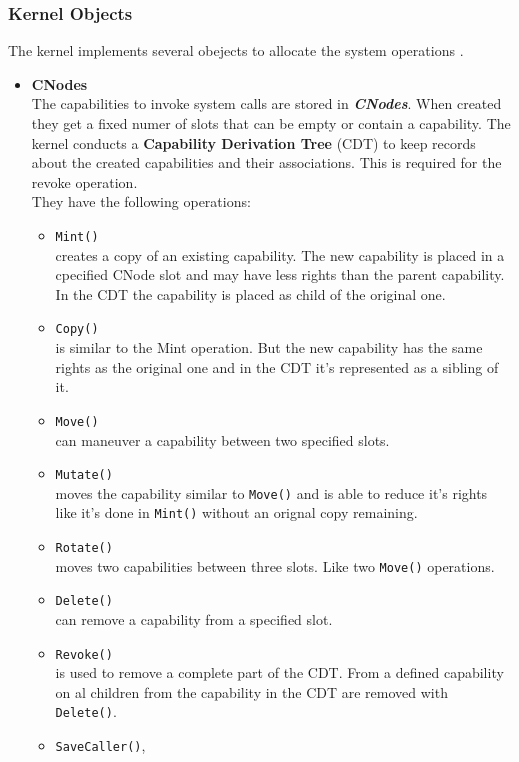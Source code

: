 \documentclass[pdftex,11pt,a4paper]{article}
\begin{document}
	\subsubsection{Kernel Objects}
	The kernel implements several obejects to allocate the system operations \cite{Manual}.
	\begin{itemize}
	\item \textbf{CNodes} \\
	The capabilities to invoke system calls are stored in \textbf{\textit{CNodes}}. When created they get a fixed numer of slots that can be empty or contain a capability. 
	The kernel conducts a \textbf{Capability Derivation Tree} (CDT) to keep records about the created capabilities and their associations. This is required for the revoke operation. \\ 
	They have the following operations:
\begin{itemize}
\item \texttt{Mint()} \\
creates a copy of an existing capability. The new capability is placed in a cpecified CNode slot and may have less rights than the parent capability. In the CDT the capability is placed as child of the original one. 
\item \texttt{Copy()} \\
is similar to the Mint operation. But the new capability has the same rights as the original one and in the CDT it's represented as a sibling of it. 
\item \texttt{Move()} \\
can maneuver a capability between two specified slots. 
\item \texttt{Mutate()} \\
moves the capability similar to \texttt{Move()} and is able to reduce it's rights like it's done in \texttt{Mint()} without an orignal copy remaining.
\item \texttt{Rotate()} \\
moves two capabilities between three slots. Like two \texttt{Move()} operations. 
\item \texttt{Delete()} \\
can remove a capability from a specified slot.
\item \texttt{Revoke()} \\
is used to remove a complete part of the CDT. From a defined capability on al children from the capability in the CDT are removed with \texttt{Delete()}. 
\item \texttt{SaveCaller()}, 

\end{itemize}
\end{itemize}
\end{document}
